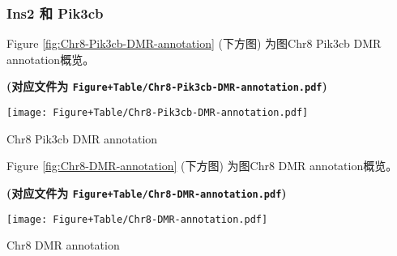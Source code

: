 \documentclass[
]{article}
\begin{document}
\begin{center}\vspace{1.5cm}\end{center}

\hypertarget{ins2-ux548c-pik3cb}{%
\subsubsection{Ins2 和 Pik3cb}\label{ins2-ux548c-pik3cb}}

\begin{center}\vspace{1.5cm}\end{center}

Figure \ref{fig:Chr8-Pik3cb-DMR-annotation} (下方图) 为图Chr8 Pik3cb DMR annotation概览。

\textbf{(对应文件为 \texttt{Figure+Table/Chr8-Pik3cb-DMR-annotation.pdf})}

\def\@captype{figure}
\begin{center}
\texttt{[image: Figure+Table/Chr8-Pik3cb-DMR-annotation.pdf]}
\caption{Chr8 Pik3cb DMR annotation}\label{fig:Chr8-Pik3cb-DMR-annotation}
\end{center}

\begin{center}\vspace{1.5cm}\end{center}

\begin{center}\vspace{1.5cm}\end{center}

Figure \ref{fig:Chr8-DMR-annotation} (下方图) 为图Chr8 DMR annotation概览。

\textbf{(对应文件为 \texttt{Figure+Table/Chr8-DMR-annotation.pdf})}

\def\@captype{figure}
\begin{center}
\texttt{[image: Figure+Table/Chr8-DMR-annotation.pdf]}
\caption{Chr8 DMR annotation}\label{fig:Chr8-DMR-annotation}
\end{center}

\begin{center}\vspace{1.5cm}\end{center}
\end{document}
